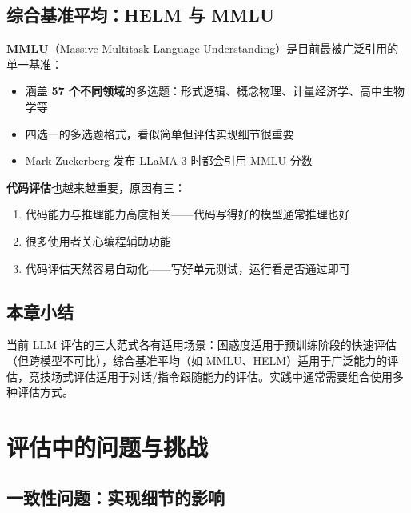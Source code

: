 \documentclass[a4paper]{article}
\begin{document}
\subsection{综合基准平均：HELM 与 MMLU}





\textbf{MMLU}（Massive Multitask Language Understanding）是目前最被广泛引用的单一基准：

\begin{itemize}
    \item 涵盖 \textbf{57 个不同领域}的多选题：形式逻辑、概念物理、计量经济学、高中生物学等
    \item 四选一的多选题格式，看似简单但评估实现细节很重要
    \item Mark Zuckerberg 发布 LLaMA 3 时都会引用 MMLU 分数
\end{itemize}





\textbf{代码评估}也越来越重要，原因有三：
\begin{enumerate}
    \item 代码能力与推理能力高度相关——代码写得好的模型通常推理也好
    \item 很多使用者关心编程辅助功能
    \item 代码评估天然容易自动化——写好单元测试，运行看是否通过即可
\end{enumerate}

\subsection{本章小结}

当前 LLM 评估的三大范式各有适用场景：困惑度适用于预训练阶段的快速评估（但跨模型不可比），综合基准平均（如 MMLU、HELM）适用于广泛能力的评估，竞技场式评估适用于对话/指令跟随能力的评估。实践中通常需要组合使用多种评估方式。


\section{评估中的问题与挑战}

\subsection{一致性问题：实现细节的影响}
\end{document}
